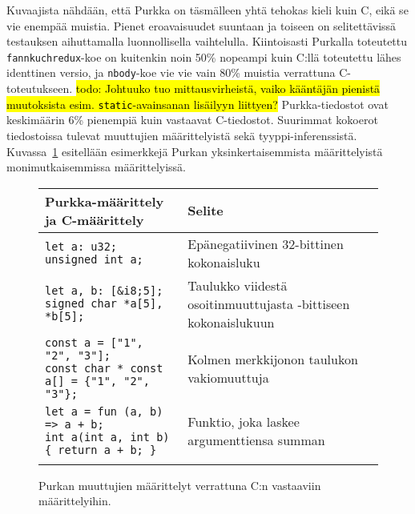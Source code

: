 Kuvaajista nähdään, että Purkka on täsmälleen yhtä tehokas kieli kuin C, eikä
se vie enempää muistia. Pienet eroavaisuudet suuntaan ja toiseen on
selitettävissä testauksen aihuttamalla luonnollisella vaihtelulla. Kiintoisasti
Purkalla toteutettu \texttt{fannkuchredux}-koe on kuitenkin noin 50\% nopeampi
kuin C:llä toteutettu lähes identtinen versio, ja \texttt{nbody}-koe vie vie
vain 80\% muistia verrattuna C-toteutukseen. \hl{todo: Johtuuko tuo
mittausvirheistä, vaiko kääntäjän pienistä muutoksista esim.
\texttt{static}-avainsanan lisäilyyn liittyen?} Purkka-tiedostot ovat
keskimäärin 6\% pienempiä kuin vastaavat C-tiedostot. Suurimmat kokoerot
tiedostoissa tulevat muuttujien määrittelyistä sekä tyyppi-inferenssistä.
Kuvassa~\ref{fig:declarations} esitellään esimerkkejä Purkan
yksinkertaisemmista määrittelyistä monimutkaisemmissa määrittelyissä.

\begin{figure}[ht!]
    \begin{adjustbox}{center}
        \begin{tabular}{@{} m{} m{} @{}} \toprule
            Purkka-määrittely ja C-määrittely & Selite \\ \midrule

            \texttt{let a: u32; \newline unsigned int a;} & Epänegatiivinen 32-bittinen kokonaisluku \\
            \noalign{\vspace{0.2cm}}

            \texttt{let a, b: [\&i8;5]; \newline signed char *a[5], *b[5];} & Taulukko viidestä osoitinmuuttujasta \newline 8-bittiseen kokonaislukuun \\
            \noalign{\vspace{0.2cm}}

            \texttt{const a = ["1", "2", "3"]; \newline const char * const a[] = \{"1", "2", "3"\};} & Kolmen merkkijonon taulukon vakiomuuttuja \\
            \noalign{\vspace{0.2cm}}

            \texttt{let a = fun (a, b) => a + b; \newline int a(int a, int b) \{ return a + b; \}} & Funktio, joka laskee argumenttiensa summan \\
            \noalign{\vspace{0.2cm}}

            \bottomrule
        \end{tabular}
    \end{adjustbox}
    \label{fig:declarations}
    \caption{Purkan muuttujien määrittelyt verrattuna C:n vastaaviin
    määrittelyihin.}
\end{figure}


